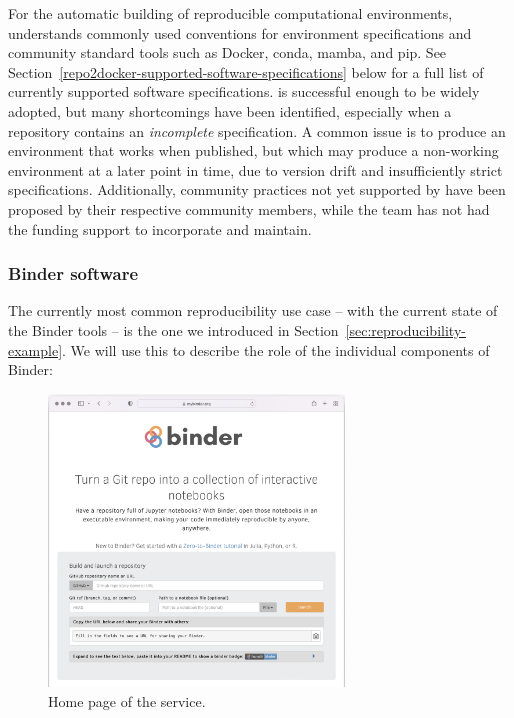 For the automatic building of reproducible computational environments,
\repotodocker{} understands commonly used conventions for environment specifications and
community standard tools such as Docker, conda, mamba, and pip. See
Section~\ref{repo2docker-supported-software-specifications} below for a full list of
currently supported software specifications.
\repotodocker{} is successful enough to be widely adopted,
but many shortcomings have been identified,
especially when a repository contains an \emph{incomplete} specification.
A common issue is to produce an environment that works when published,
but which may produce a non-working environment at a later point in time,
due to version drift and insufficiently strict specifications.
Additionally, community practices not yet supported by \repotodocker{} have been proposed by their respective community members,
while the \repotodocker{} team has not had the funding support to incorporate and maintain.

\subsubsection{Binder software}
\label{binder-how-does-it-work}

The currently most common reproducibility use case -- with the current state of the Binder
tools -- is the one we introduced in
Section~\ref{sec:reproducibility-example}. We will use this to
describe the role of the individual components of Binder:


\begin{figure}[ht]
  \centering
    \includegraphics[width=0.7\textwidth]{images/mybinder.png}
    \caption{Home page of the \mybinder{} service.}
    \label{fig:mybinder-homepage}
\end{figure}


